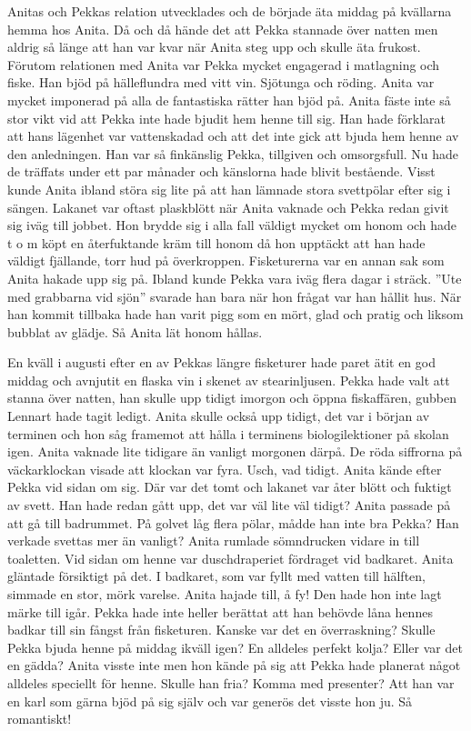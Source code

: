 Anitas och Pekkas relation utvecklades och de började äta middag på kvällarna hemma hos Anita. Då och då hände det att Pekka stannade över natten men aldrig så länge att han var kvar när Anita steg upp och skulle äta frukost. Förutom relationen med Anita var Pekka mycket engagerad i matlagning och fiske. Han bjöd på hälleflundra med vitt vin. Sjötunga och röding. Anita var mycket imponerad på alla de fantastiska rätter han bjöd på. Anita fäste inte så stor vikt vid att Pekka inte hade bjudit hem henne till sig. Han hade förklarat att hans lägenhet var vattenskadad och att det inte gick att bjuda hem henne av den anledningen. Han var så finkänslig Pekka, tillgiven och omsorgsfull. Nu hade de träffats under ett par månader och känslorna hade blivit bestående. Visst kunde Anita ibland störa sig lite på att han lämnade stora svettpölar efter sig i sängen. Lakanet var oftast plaskblött när Anita vaknade och Pekka redan givit sig iväg till jobbet. Hon brydde sig i alla fall väldigt mycket om honom och hade t o m köpt en återfuktande kräm till honom då hon upptäckt att han hade väldigt fjällande, torr hud på överkroppen.  Fisketurerna var en annan sak som Anita hakade upp sig på. Ibland kunde Pekka vara iväg flera dagar i sträck. ”Ute med grabbarna vid sjön” svarade han bara när hon frågat var han hållit hus. När han kommit tillbaka hade han varit pigg som en mört, glad och pratig och liksom bubblat av glädje. Så Anita lät honom hållas. 

En kväll i augusti efter en av Pekkas längre fisketurer hade paret ätit en god middag och avnjutit en flaska vin i skenet av stearinljusen. Pekka hade valt att stanna över natten, han skulle upp tidigt imorgon och öppna fiskaffären, gubben Lennart hade tagit ledigt. Anita skulle också upp tidigt, det var i början av terminen och hon såg framemot att hålla i terminens biologilektioner på skolan igen. Anita vaknade lite tidigare än vanligt morgonen därpå. De röda siffrorna på väckarklockan visade att klockan var fyra. Usch, vad tidigt. Anita kände efter Pekka vid sidan om sig. Där var det tomt och lakanet var åter blött och fuktigt av svett. Han hade redan gått upp, det var väl lite väl tidigt? Anita passade på att gå till badrummet. På golvet låg flera pölar, mådde han inte bra Pekka? Han verkade svettas mer än vanligt?  Anita rumlade sömndrucken vidare in till toaletten. Vid sidan om henne var duschdraperiet fördraget vid badkaret. Anita gläntade försiktigt på det. I badkaret, som var fyllt med vatten till hälften, simmade en stor, mörk varelse. Anita hajade till, å fy! Den hade hon inte lagt märke till igår. Pekka hade inte heller berättat att han behövde låna hennes badkar till sin fångst från fisketuren. Kanske var det en överraskning? Skulle Pekka bjuda henne på middag ikväll igen? En alldeles perfekt kolja? Eller var det en gädda? Anita visste inte men hon kände på sig att Pekka hade planerat något alldeles speciellt för henne. Skulle han fria? Komma med presenter? Att han var en karl som gärna bjöd på sig själv och var generös det visste hon ju. Så romantiskt! 

